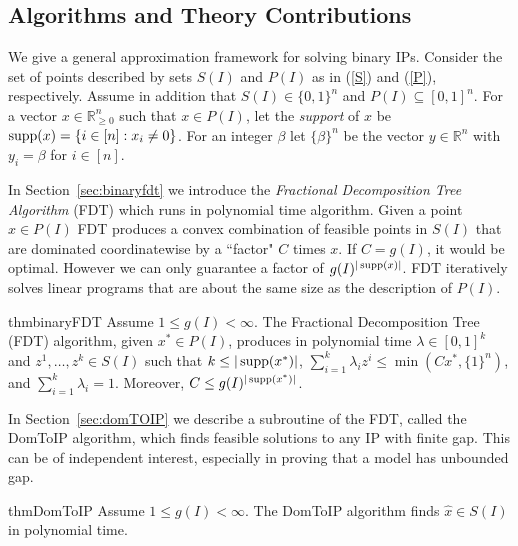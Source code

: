 \subsection{Algorithms and Theory Contributions} 
 
We give a general approximation framework for solving binary IPs.
Consider the set of points described by sets $S(I)$ and $P(I)$ as in (\ref{S}) and (\ref{P}), respectively. Assume in addition that $S(I)\in \{0,1\}^n$ and $P(I)\subseteq [0,1]^n$.
For a vector $x\in \mathbb{R}_{\geq 0}^n$ such that $x\in P(I)$, let the {\em support} of $x$ be $\operatorname{supp}(x)= \{i \in [n]: x_i \neq 0\}$. For an integer $\beta$ let $\{\beta\}^n$ be the vector $y\in \mathbb{R}^n$ with $y_i=\beta$ for $i\in [n]$.


In Section~\ref{sec:binaryfdt} we introduce the \textit{Fractional Decomposition Tree Algorithm} (FDT) which runs in polynomial time algorithm. Given a point $x\in P(I)$ FDT produces a convex combination of feasible points in $S(I)$ that are dominated coordinatewise by a ``factor" $C$ times $x$.
If $C = g(I)$, it would be optimal. However we can only guarantee a factor of $g(I)^{|\operatorname{supp}(x)|}$. FDT iteratively solves linear programs that are about the same size as the description of $P(I)$.

\begin{restatable}{thm}{binaryFDT}
	\label{binaryFDT}
	Assume $1\leq g(I) 	<\infty$. 	
	The Fractional Decomposition Tree (FDT) algorithm, given $x^*\in P(I)$, produces in polynomial time $\lambda\in [0,1]^k$ and $z^1,\ldots,z^k \in S(I)$ such that $k\leq |\operatorname{supp}(x^*)|$, $\sum_{i=1}^{k}\lambda_i z^i\leq \min(Cx^*,\{1\}^{n})$, and $\sum_{i=1}^{k}\lambda_i = 1$. Moreover, $C\leq g(I)^{|\operatorname{supp}(x^*)|}$.
\end{restatable}

In Section~\ref{sec:domTOIP} we describe a subroutine of the FDT, called the DomToIP algorithm, which finds feasible solutions to any IP with finite gap. This can be of independent interest, especially in proving that a model has unbounded gap.
\begin{restatable}{thm}{DomToIP}
	\label{domtoIP}
	Assume $1\leq g(I) < \infty$. The DomToIP algorithm finds $\hat{x}\in S(I)$ in polynomial time.
\end{restatable}


